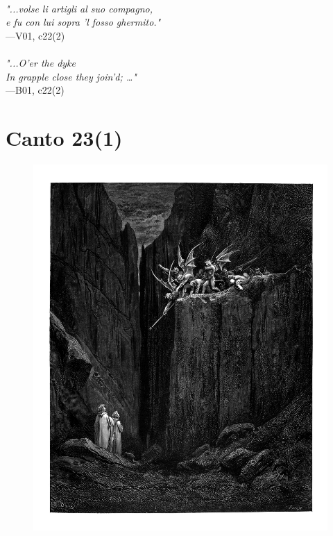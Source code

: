 \documentclass[../Dore_vision.tex]{subfiles}
\begin{document}
\begin{center}
\begin{minipage}{0.8\linewidth}
\textit{\\
"...volse li artigli al suo compagno,\\e fu con lui sopra ’l fosso ghermito."} \\
—V01, c22(2) \\~\\
\textit{"...O'er the dyke\\In grapple close they join'd; …"} \\
—B01, c22(2)
\end{minipage}
\end{center}

\newpage

\section{Canto 23(1)}

\begin{figure}[ht]
\centering
\includegraphics[height=\figsize]{illustrations/book_1/V01, c23(1).jpg}
\end{figure}
\end{document}
